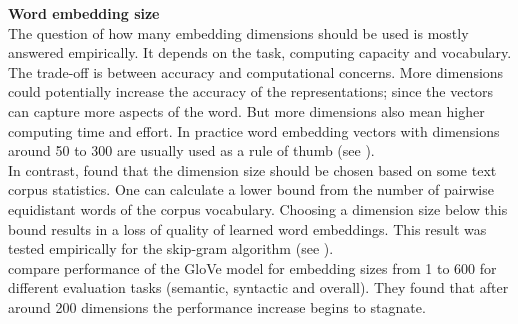 \documentclass[]{krantz}
\begin{document}
\textbf{Word embedding size}\\
The question of how many embedding dimensions should be used is mostly answered empirically. It depends on the task, computing capacity and vocabulary. The trade-off is between accuracy and computational concerns. More dimensions could potentially increase the accuracy of the representations; since the vectors can capture more aspects of the word. But more dimensions also mean higher computing time and effort. In practice word embedding vectors with dimensions around 50 to 300 are usually used as a rule of thumb (see \citet{goldberg2016primer}).\\
In contrast, \citet{patel2017towards} found that the dimension size should be chosen based on some text corpus statistics. One can calculate a lower bound from the number of pairwise equidistant words of the corpus vocabulary. Choosing a dimension size below this bound results in a loss of quality of learned word embeddings. This result was tested empirically for the skip-gram algorithm (see \citet{patel2017towards}).\\
\citet{Pennington.2014} compare performance of the GloVe model for embedding sizes from 1 to 600 for different evaluation tasks (semantic, syntactic and overall). They found that after around 200 dimensions the performance increase begins to stagnate.
\end{document}
